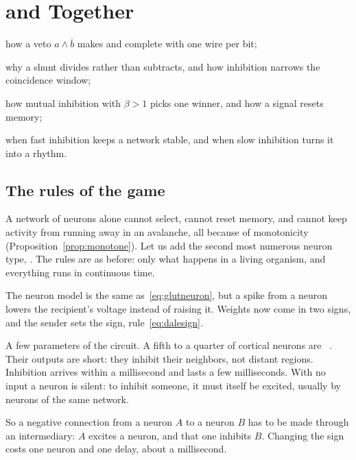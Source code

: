 \chapter{ and  Together}
\label{sec:gaba}
\begin{chaptergoals}
\item how a veto $a\wedge\bar b$ makes  and  complete with one wire per bit;
\item why a shunt divides rather than subtracts, and how inhibition narrows the coincidence window;
\item how mutual inhibition with $\beta>1$ picks one winner, and how a signal resets memory;
\item when fast inhibition keeps a network stable, and when slow inhibition turns it into a rhythm.
\end{chaptergoals}

\section{The rules of the game}

A network of  neurons alone cannot select, cannot reset memory, and cannot keep activity from running away in an avalanche, all because of monotonicity (Proposition~\ref{prop:monotone}). Let us add the second most numerous neuron type, . The rules are as before: only what happens in a living organism, and everything runs in continuous time.

The neuron model is the same as~\eqref{eq:glutneuron}, but a spike from a  neuron lowers the recipient's voltage instead of raising it. Weights now come in two signs, and the sender sets the sign, rule~\eqref{eq:dalesign}.

A few parameters of the circuit. A fifth to a quarter of cortical neurons are ~\cite{Hendry1987}. Their outputs are short: they inhibit their neighbors, not distant regions. Inhibition arrives within a millisecond and lasts a few milliseconds. With no input a  neuron is silent: to inhibit someone, it must itself be excited, usually by  neurons of the same network.

So a negative connection from a  neuron $A$ to a neuron $B$ has to be made through an intermediary: $A$ excites a  neuron, and that one inhibits $B$. Changing the sign costs one neuron and one delay, about a millisecond.

